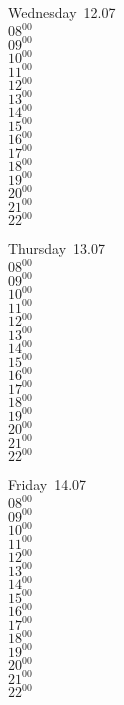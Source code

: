 \documentclass[11pt,a4paper]{book}\usepackage[]{graphicx}\usepackage[]{color}
\begin{document}
\begin{weekdaybox}
  Wednesday~12.07\\
  { 
  \vfill
  $08^{00}$\\
$09^{00}$\\
$10^{00}$\\
$11^{00}$\\
$12^{00}$\\
$13^{00}$\\
$14^{00}$\\
$15^{00}$\\
$16^{00}$\\
$17^{00}$\\
$18^{00}$\\
$19^{00}$\\
$20^{00}$\\
$21^{00}$\\
$22^{00}$\\
  }
\end{weekdaybox}
\clearpage
\begin{headerbox}
\end{headerbox}
\begin{weekdaybox}
  Thursday~13.07\\
  { 
  \vfill
  $08^{00}$\\
$09^{00}$\\
$10^{00}$\\
$11^{00}$\\
$12^{00}$\\
$13^{00}$\\
$14^{00}$\\
$15^{00}$\\
$16^{00}$\\
$17^{00}$\\
$18^{00}$\\
$19^{00}$\\
$20^{00}$\\
$21^{00}$\\
$22^{00}$\\
  }
\end{weekdaybox} 
\begin{weekdaybox}
  Friday~14.07\\
  { 
  \vfill
  $08^{00}$\\
$09^{00}$\\
$10^{00}$\\
$11^{00}$\\
$12^{00}$\\
$13^{00}$\\
$14^{00}$\\
$15^{00}$\\
$16^{00}$\\
$17^{00}$\\
$18^{00}$\\
$19^{00}$\\
$20^{00}$\\
$21^{00}$\\
$22^{00}$\\
  }
\end{weekdaybox}
\end{document}
